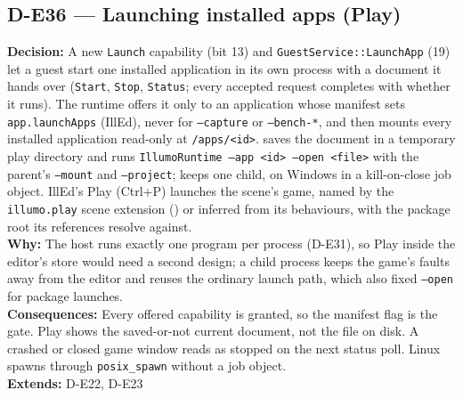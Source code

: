 \subsection*{D-E36 --- Launching installed apps (Play)}
\begin{decisionbox}[title={D-E36 \quad 2026-10-01}]
\textbf{Decision:} A new \texttt{Launch} capability (bit 13) and
\texttt{GuestService::LaunchApp} (19) let a guest start one installed
application in its own process with a document it hands over
(\texttt{Start}, \texttt{Stop}, \texttt{Status}; every accepted request
completes with whether it runs). The runtime offers it only to an
application whose manifest sets \texttt{app.launchApps} (IllEd), never for
\texttt{--capture} or \texttt{--bench-*}, and then mounts every installed
application read-only at \texttt{/apps/<id>}. 
saves the document in a temporary play directory and runs
\texttt{IllumoRuntime --app <id> --open <file>} with the parent's
\texttt{--mount} and \texttt{--project};  keeps one
child, on Windows in a kill-on-close job object. IllEd's Play (Ctrl+P) launches
the scene's game, named by the \texttt{illumo.play} scene extension
() or inferred from its behaviours, with the package
root its references resolve against.\\
\textbf{Why:} The host runs exactly one program per process (D-E31), so Play
inside the editor's store would need a second design; a child process keeps
the game's faults away from the editor and reuses the ordinary launch path,
which also fixed \texttt{--open} for package launches.\\
\textbf{Consequences:} Every offered capability is granted, so the manifest
flag is the gate. Play shows the saved-or-not current document, not the
file on disk. A crashed or closed game window reads as stopped on the next
status poll. Linux spawns through \texttt{posix\_spawn} without a job
object.\\
\textbf{Extends:} D-E22, D-E23
\end{decisionbox}

